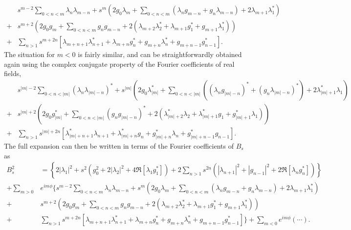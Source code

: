 \begin{equation}
\begin{aligned}
    &s^{m-2} \sum_{0<n<m} \lambda_n \lambda_{m-n} + s^m \left(2g_0 \lambda_m + \sum_{0<n<m} (\lambda_n g_{m-n} + g_n \lambda_{m-n}) + 2 \lambda_{m+1} \lambda_1^*\right) \\ 
    +& s^{m+2} \left(2g_0 g_m + \sum_{0 < n < m} g_n g_{m-n} + 2 \left(\lambda_{m+2} \lambda_2^* + \lambda_{m+1} g_1^* + g_{m+1} \lambda_1^*\right) \right) \\
    +& \sum_{n > 1} s^{m+2n} \left[\lambda_{m+n+1} \lambda_{n+1}^* + \lambda_{m+n} g_n^* + g_{m+n} \lambda_n^* + g_{m+n-1} g_{n-1}^*\right].
\end{aligned}
\end{equation}
The situation for $m < 0$ is fairly similar, and can be straightforwardly obtained again using the complex conjugate property of the Fourier coefficients of real fields,
\begin{equation}
    \begin{aligned}
        &s^{|m|-2} \sum_{0<n<|m|} (\lambda_n \lambda_{|m|-n})^* + s^{|m|} \left(2g_0 \lambda_{|m|}^* + \sum_{0<n<|m|} ((\lambda_n g_{|m|-n})^* + (g_n \lambda_{|m|-n})^*) + 2 \lambda_{|m|+1}^* \lambda_1\right) \\ 
        +& s^{|m|+2} \left(2g_0 g_{|m|}^* + \sum_{0 < n < |m|} (g_n g_{|m|-n})^* + 2 \left(\lambda_{|m|+2}^* \lambda_2 + \lambda_{|m|+1}^* g_1 + g_{|m|+1}^* \lambda_1\right) \right) \\
        +& \sum_{n > 1} s^{|m|+2n} \left[\lambda_{|m|+n+1}^* \lambda_{n+1} + \lambda_{|m|+n}^* g_n + g_{|m|+n}^* \lambda_n + g_{|m|+n-1}^* g_{n-1}\right].
    \end{aligned}
\end{equation}
The full expansion can then be written in terms of the Fourier coefficients of $B_s$ as
\begin{equation}
\begin{aligned}
    B_s^2 &= \left\{2|\lambda_1|^2 + s^2\left(g_0^2 + 2|\lambda_2|^2 + 4 \Re[\lambda_1 g_1^*]\right) + 2\sum_{n>1} s^{2n} \left(|\lambda_{n+1}|^2 + |g_{n-1}|^2 + 2 \Re[\lambda_n g_n^*]\right)\right\} \\
    + \sum_{m>0} &e^{im\phi} \Bigg\{s^{m-2} \sum_{0<n<m} \lambda_n \lambda_{m-n} + s^m \left(2g_0 \lambda_m + \sum_{0<n<m} (\lambda_n g_{m-n} + g_n \lambda_{m-n}) + 2 \lambda_{m+1} \lambda_1^* \right) \\ 
    +& s^{m+2} \left(2g_0 g_m + \sum_{0 < n < m} g_n g_{m-n} + 2 \left(\lambda_{m+2} \lambda_2^* + \lambda_{m+1} g_1^* + g_{m+1} \lambda_1^*\right) \right) \\
    +& \sum_{n > 1} s^{m+2n} \left[\lambda_{m+n+1} \lambda_{n+1}^* + \lambda_{m+n} g_n^* + g_{m+n} \lambda_n^* + g_{m+n-1} g_{n-1}^* \right]\Bigg\} + \sum_{m<0} e^{im\phi} \left(\cdots\right).
\end{aligned}
\end{equation}

